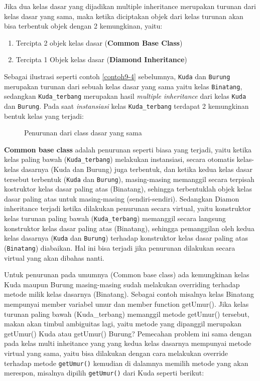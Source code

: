Jika dua kelas dasar yang dijadikan multiple inheritance merupakan
turunan dari kelas dasar yang sama, maka ketika diciptakan objek dari
kelas turunan akan bisa terbentuk objek dengan 2 kemungkinan, yaitu:

\begin{enumerate}


\item
 Tercipta 2 objek kelas dasar (\textbf{Common Base Class})
\item
 Tercipta 1 Objek kelas dasar (\textbf{Diamond Inheritance})
\end{enumerate}

Sebagai ilustrasi seperti contoh \ref{contoh9-4} sebelumnya, \texttt{Kuda} dan
\texttt{Burung} merupakan turunan dari sebuah kelas dasar yang sama
yaitu kelas \texttt{Binatang}, sedangkan \texttt{Kuda\_terbang}
merupakan hasil \emph{multiple inheritance} dari kelas \texttt{Kuda} dan
\texttt{Burung}. Pada saat \emph{instansiasi} kelas
\texttt{Kuda\_terbang} terdapat 2 kemungkinan bentuk kelas yang terjadi:

\begin{figure}[htbp]
\centering
{}
\caption{Penurunan dari class dasar yang sama}
\end{figure}

\textbf{Common base class} adalah penurunan seperti biasa yang terjadi,
yaitu ketika kelas paling bawah (\texttt{Kuda\_terbang}) melakukan
instansiasi, secara otomatis kelas-kelas dasarnya (Kuda dan Burung) juga
terbentuk, dan ketika kedua kelas dasar tersebut terbentuk
(\texttt{Kuda} dan \texttt{Burung}), masing-masing memanggil secara
terpisah kostruktor kelas dasar paling atas (Binatang), sehingga
terbentuklah objek kelas dasar paling atas untuk masing-masing
(sendiri-sendiri). Sedangkan Diamon inheritance terjadi ketika dilakukan
penurunan secara virtual, yaitu konstruktor kelas turunan paling bawah
(\texttt{Kuda\_terbang}) memanggil secara langsung konstruktor kelas
dasar paling atas (Binatang), sehingga pemanggilan oleh kedua kelas
dasarnya (\texttt{Kuda} dan \texttt{Burung}) terhadap konstruktor kelas
dasar paling atas (\texttt{Binatang}) diabaikan. Hal ini bisa terjadi
jika penurunan dilakukan secara virtual yang akan dibahas nanti.

Untuk penurunan pada umumnya (Common base class) ada kemungkinan kelas
Kuda maupun Burung masing-masing sudah melakukan overriding terhadap
metode milik kelas dasarnya (Binatang). Sebagai contoh misalnya kelas
Binatang mempunyai member variabel umur dan member function getUmur().
Jika kelas turunan paling bawah (Kuda\_terbang) memanggil metode
getUmur() tersebut, makan akan timbul ambiguitas lagi, yaitu metode yang
dipanggil merupakan getUmur() Kuda atau getUmur() Burung? Pemecahan
problem ini sama dengan pada kelas multi inheitance yang yang kedua
kelas dasarnya mempunyai metode virtual yang sama, yaitu bisa dilakukan
dengan cara melakukan override terhadap metode \texttt{getUmur()} kemudian di
dalamnya memilih metode yang akan merespon, misalnya dipilih \texttt{getUmur()}
dari Kuda seperti berikut:

